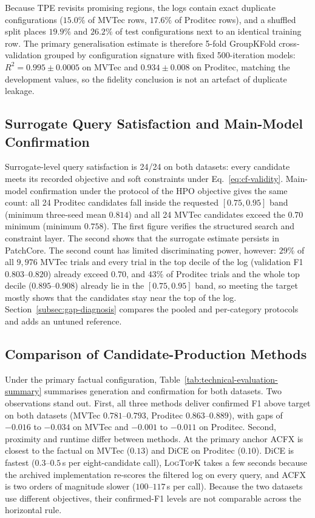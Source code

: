 \documentclass[final,5p,times,twocolumn]{elsarticle}
\begin{document}
Because TPE revisits promising regions, the logs contain exact
duplicate configurations ($15.0\%$ of MVTec rows, $17.6\%$ of
Proditec rows), and a shuffled split places $19.9\%$ and $26.2\%$ of
test configurations next to an identical training row. The primary
generalisation estimate is therefore 5-fold GroupKFold cross-validation
grouped by configuration signature with fixed 500-iteration models:
$R^2 = 0.995 \pm 0.0005$ on MVTec and $0.934 \pm 0.008$ on Proditec,
matching the development values, so the fidelity conclusion is not an
artefact of duplicate leakage. 

\subsection{Surrogate Query Satisfaction and Main-Model Confirmation}
\label{subsec:cf-validity}

Surrogate-level query satisfaction is 24/24 on both datasets: every
candidate meets its recorded objective and soft constraints under
Eq.~\ref{eq:cf-validity}. Main-model confirmation under the protocol of
the HPO objective gives the same count: all 24 Proditec candidates fall
inside the requested $[0.75, 0.95]$ band (minimum three-seed mean
$0.814$) and all 24 MVTec candidates exceed the $0.70$ minimum (minimum
$0.758$). The first figure verifies the structured search and constraint layer. The second shows that the surrogate estimate persists in PatchCore. The
second count has limited discriminating power, however: $29\%$ of all
$9{,}976$ MVTec trials and every trial in the top decile of the log
(validation F1 $0.803$--$0.820$) already exceed $0.70$, and $43\%$ of
Proditec trials and the whole top decile ($0.895$--$0.908$) already lie
in the $[0.75, 0.95]$ band, so meeting the target mostly shows that the
candidates stay near the top of the log.
Section~\ref{subsec:gap-diagnosis} compares the pooled and per-category
protocols and adds an untuned reference.

\subsection{Comparison of Candidate-Production Methods}
\label{subsec:cf-comparison}

Under the primary factual configuration,
Table~\ref{tab:technical-evaluation-summary} summarises generation and
confirmation for both datasets. Two observations stand out. First, all
three methods deliver confirmed F1 above target on both datasets
(MVTec $0.781$--$0.793$, Proditec $0.863$--$0.889$), with gaps of
$-0.016$ to $-0.034$ on MVTec and $-0.001$ to $-0.011$ on Proditec.
Second, proximity and runtime differ between methods. At the primary
anchor ACFX is closest to the factual on MVTec ($0.13$) and DiCE on Proditec ($0.10$). DiCE is fastest ($0.3$--$0.5$\,s per eight-candidate call), \textsc{LogTopK} takes a few seconds because the archived implementation re-scores the filtered log on every query, and ACFX is two orders of magnitude slower ($100$--$117$\,s per call). Because the two
datasets use different objectives, their confirmed-F1 levels are not
comparable across the horizontal rule.
\end{document}
